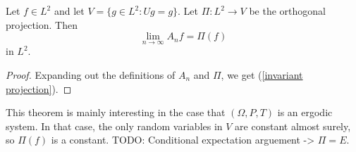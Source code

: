 \begin{theorem}
Let $f \in L^2$ and let $V = \{g \in L^2: Ug = g\}$.
Let $\Pi: L^2 \to V$ be the orthogonal projection.
Then
\[\lim_{n \to \infty} A_nf = \Pi(f)\]
in $L^2$.
\end{theorem}
\begin{proof}
Expanding out the definitions of $A_n$ and $\Pi$, we get (\ref{invariant projection}).
\end{proof}

This theorem is mainly interesting in the case that $(\Omega, P, T)$ is an ergodic system.
In that case, the only random variables in $V$ are constant almost surely, so $\Pi(f)$ is a constant.
TODO: Conditional expectation arguement -> $\Pi = E$.
